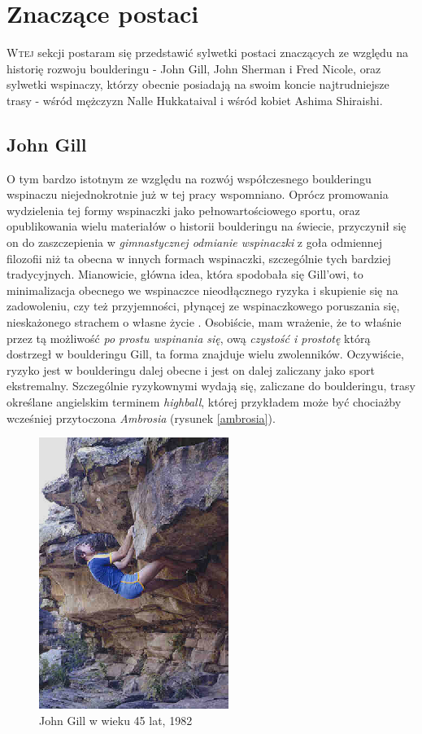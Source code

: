\documentclass{article}
\begin{document}
\section{Znaczące postaci}
\lettrine[lines=2]{W}{tej} sekcji postaram się przedstawić sylwetki postaci znaczących ze względu na historię rozwoju boulderingu - John Gill, John Sherman i Fred Nicole, oraz sylwetki wspinaczy, którzy obecnie posiadają na swoim koncie najtrudniejsze trasy - wśród mężczyzn Nalle Hukkataival i wśród kobiet Ashima Shiraishi. 

\subsection{John Gill}
\label{jg}
O tym bardzo istotnym ze względu na rozwój współczesnego boulderingu wspinaczu niejednokrotnie już w tej pracy wspomniano. Oprócz promowania wydzielenia tej formy wspinaczki jako pełnowartościowego sportu, oraz opublikowania wielu materiałów o historii boulderingu na świecie, przyczynił się on do zaszczepienia w \textit{gimnastycznej odmianie wspinaczki} z goła odmiennej filozofii niż ta obecna w innych formach wspinaczki, szczególnie tych bardziej tradycyjnych. Mianowicie, główna idea, która spodobała się Gill'owi, to minimalizacja obecnego we wspinaczce nieodłącznego ryzyka i skupienie się na zadowoleniu, czy też przyjemności, płynącej ze wspinaczkowego poruszania się, nieskażonego strachem o własne życie \cite{gill-philosophy}. Osobiście, mam wrażenie, że to właśnie przez tą możliwość \textit{po prostu wspinania się}, ową \textit{czystość i prostotę} którą dostrzegł w boulderingu Gill, ta forma znajduje wielu zwolenników. Oczywiście, ryzyko jest w boulderingu dalej obecne i jest on dalej zaliczany jako sport ekstremalny. Szczególnie ryzykownymi wydają się, zaliczane do boulderingu, trasy określane angielskim terminem \textit{highball}, której przykładem może być chociażby wcześniej przytoczona \textit{Ambrosia} (rysunek \ref{ambrosia}).

\begin{figure}[!htbp]
	\begin{center}
		\includegraphics[width=0.5\linewidth]{images/gill-2.eps}
	\end{center}
	\caption{John Gill w wieku 45 lat, 1982 \cite{gill-website}}
	\label{gill-1}
\end{figure}
\end{document}
